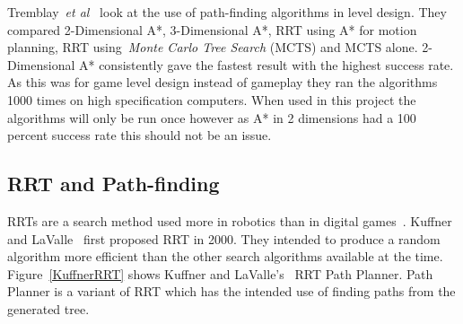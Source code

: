 \documentclass[journal]{IEEEtran}
\begin{document}
	Tremblay~\textit{et al}~\cite{Tremblay2014} look at the use of path-finding algorithms in level design. They compared 2-Dimensional A*, 3-Dimensional A*, RRT using A* for motion planning, RRT using~\textit{Monte Carlo Tree Search} (MCTS) and MCTS alone. 2-Dimensional A* consistently gave the fastest result with the highest success rate. As this was for game level design instead of gameplay they ran the algorithms 1000 times on high specification computers. When used in this project the algorithms will only be run once however as A* in 2 dimensions had a 100 percent success rate this should not be an issue. 
	
	\subsection{RRT and Path-finding} \label{RRTadnPathfinding}
	RRTs are a search method used more in robotics than in digital games~\cite{LaValle1998, Kuffner2000}. Kuffner and LaValle~\cite{Kuffner2000} first proposed RRT in 2000. They intended to produce a random algorithm more efficient than the other search algorithms available at the time.  Figure~\ref{KuffnerRRT} shows Kuffner and LaValle's~\cite{Kuffner2000} RRT Path Planner. Path Planner is a variant of RRT which has the intended use of finding paths from the generated tree.
	
\end{document}
